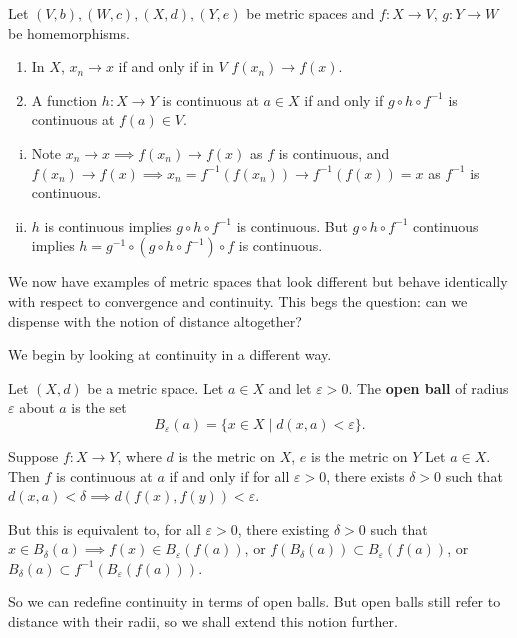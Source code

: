 \documentclass[12pt]{article}
\begin{document}
\begin{proposition}
	Let $(V, b), (W, c), (X, d), (Y, e)$ be metric spaces and $f : X \to V$, $g : Y \to W$ be homemorphisms.
	\begin{enumerate}[\normalfont(i)]
		\item In $X$, $x_n \to x$ if and only if in $V$ $f(x_n) \to f(x)$.
		\item A function $h : X \to Y$ is continuous at $a \in X$ if and only if $g \circ h \circ f^{-1}$ is continuous at $f(a) \in V$.
	\end{enumerate}
\end{proposition}

\begin{proofbox}
\begin{enumerate}[(i)]
	\item Note $x_n \to x \implies f(x_n) \to f(x)$ as $f$ is continuous, and $f(x_n) \to f(x) \implies x_n = f^{-1}(f(x_n)) \to f^{-1}(f(x)) = x$ as $f^{-1}$ is continuous.
	\item $h$ is continuous implies $g \circ h \circ f^{-1}$ is continuous. But $g \circ h \circ f^{-1}$ continuous implies $h = g^{-1} \circ( g \circ h \circ f^{-1}) \circ f$ is continuous.
\end{enumerate}
\end{proofbox}

We now have examples of metric spaces that look different but behave identically with respect to convergence and continuity. This begs the question: can we dispense with the notion of distance altogether?

We begin by looking at continuity in a different way.

\begin{definition}
	Let $(X, d)$ be a metric space. Let $a \in X$ and let $\varepsilon > 0$. The \textbf{open ball} of radius $\varepsilon$ about $a$ is the set
	\[
		B_{\varepsilon}(a) = \{x \in X \mid d(x, a) < \varepsilon\}
	.\]
\end{definition}

\begin{remark}
	Suppose $f : X \to Y$, where $d$ is the metric on $X$, $e$ is the metric on $Y$ Let $a \in X$. Then $f$ is continuous at $a$ if and only if for all $\varepsilon > 0$, there exists $\delta > 0$ such that $d(x, a) < \delta \implies d(f(x), f(y)) < \varepsilon$.

	But this is equivalent to, for all $\varepsilon > 0$, there existing $\delta > 0$ such that $x \in B_{\delta}(a) \implies f(x) \in B_{\varepsilon}(f(a))$, or $f(B_{\delta}(a)) \subset B_{\varepsilon}(f(a))$, or $B_{\delta}(a) \subset f^{-1}(B_{\varepsilon}(f(a)))$.

	So we can redefine continuity in terms of open balls. But open balls still refer to distance with their radii, so we shall extend this notion further.
\end{remark}
\end{document}
